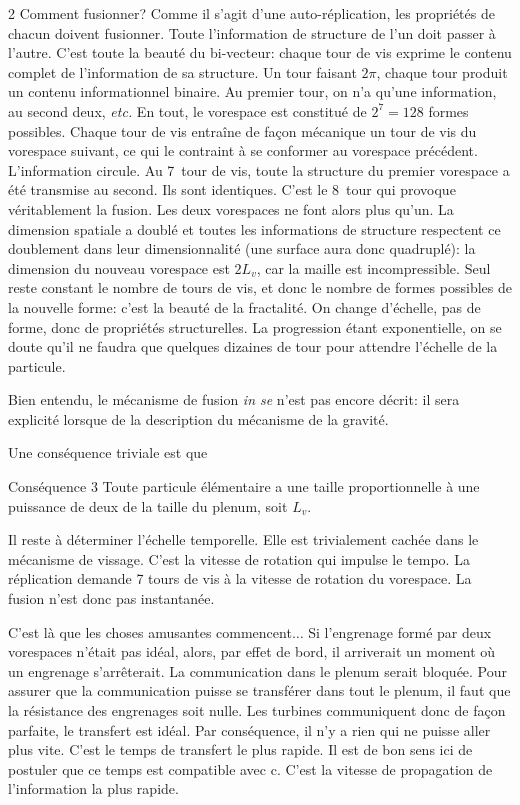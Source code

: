 \begin{multicols}{2}
Comment fusionner? Comme il s'agit d'une auto-réplication, les
propriétés de chacun doivent fusionner. Toute l'information de
structure de l'un doit passer à l'autre. C'est toute la beauté du
bi-vecteur: chaque tour de vis exprime le contenu complet de
l'information de sa structure. Un tour faisant $2\pi$, chaque tour
produit un contenu informationnel binaire. Au premier tour, on n'a
qu'une information, au second deux, \textit{etc.} En tout, le vorespace est
constitué de $2^7=128$ formes possibles. Chaque tour de vis entraîne de
façon mécanique un tour de vis du vorespace suivant, ce qui le
contraint à se conformer au vorespace précédent. L'information
circule. Au 7\ieme\ tour de vis, toute la structure du premier vorespace a
été transmise au second. Ils sont identiques. C'est le 8\ieme\ tour qui
provoque véritablement la fusion. Les deux vorespaces ne font alors
plus qu'un. La dimension spatiale a doublé et toutes les informations
de structure respectent ce doublement dans leur dimensionnalité (une
surface aura donc quadruplé): la dimension du nouveau vorespace est
$2L_v$, car la maille est incompressible. Seul reste constant le nombre
de tours de vis, et donc le nombre de formes possibles de la nouvelle
forme: c'est la beauté de la fractalité. On change d'échelle, pas de
forme, donc de propriétés structurelles. La progression étant
exponentielle, on se doute qu'il ne faudra que quelques dizaines de
tour pour attendre l'échelle de la particule.

Bien entendu, le mécanisme de fusion \textit{in se} n'est pas encore décrit:
il sera explicité lorsque de la description du mécanisme de la gravité.

Une conséquence triviale est que

\begin{mybox}[breakable,colback=blue!10, colbacktitle=pkcolor]{Conséquence 3}
	Toute particule élémentaire a une taille proportionnelle à une puissance de deux de la taille du
	plenum, soit $L_v$.
\end{mybox}
\medskip

Il reste à déterminer l'échelle temporelle. Elle est trivialement cachée
dans le mécanisme de vissage. C'est la vitesse de rotation qui impulse
le tempo. La réplication demande 7 tours de vis à la vitesse de
rotation du vorespace. La fusion n'est donc pas instantanée.

C'est là que les choses amusantes commencent$\ldots$ Si l'engrenage formé
par deux vorespaces n'était pas idéal, alors, par effet de bord, il
arriverait un moment où un engrenage s'arrêterait. La communication
dans le plenum serait bloquée. Pour assurer que la communication
puisse se transférer dans tout le plenum, il faut que la résistance
des engrenages soit nulle. Les turbines communiquent donc de façon
parfaite, le transfert est idéal. Par conséquence, il n'y a rien qui ne puisse 
aller plus vite. C'est le temps de transfert le plus rapide. Il est de
bon sens ici de postuler que ce temps est compatible avec c. C'est la
vitesse de propagation de l'information la plus rapide.


\end{multicols}
